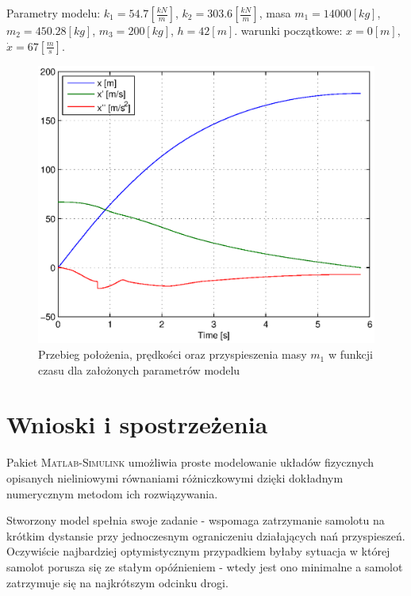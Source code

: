 \documentclass[12pt]{article}
\begin{document}
Parametry modelu: $k_1 = 54.7[\frac{kN}{m}]$, $k_2 = 303.6[\frac{kN}{m}]$, masa
$m_1 = 14000[kg]$, $m_2 = 450.28[kg]$, $m_3 = 200[kg]$, $h = 42[m]$. warunki
początkowe: $x = 0[m]$, $\dot{x} = 67[\frac{m}{s}]$.

\begin{figure}[!htb]
	\begin{center}
		\includegraphics[width=12cm]{../res/img/zad_hamsam.eps}
	\end{center} 
	\caption{Przebieg położenia, prędkości oraz
	przyspieszenia masy $m_1$ w funkcji czasu dla założonych parametrów modelu} 
	\label{rys:zad_hamsam} 
\end{figure}

\clearpage

\section{Wnioski i spostrzeżenia}

Pakiet \textsc{Matlab-Simulink} umożliwia proste modelowanie układów fizycznych
opisanych nieliniowymi równaniami różniczkowymi dzięki dokładnym numerycznym
metodom ich rozwiązywania.

Stworzony model spełnia swoje zadanie - wspomaga zatrzymanie samolotu na krótkim
dystansie przy jednoczesnym ograniczeniu działających nań przyspieszeń.
Oczywiście najbardziej optymistycznym przypadkiem byłaby sytuacja w której
samolot porusza się ze stałym opóźnieniem - wtedy jest ono minimalne a samolot
zatrzymuje się na najkrótszym odcinku drogi.
\end{document}
